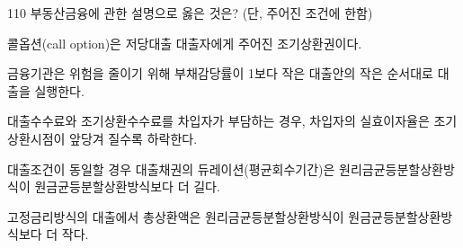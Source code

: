 \begin{question}{110}
부동산금융에 관한 설명으로 옳은 것은? (단, 주어진 조건에 한함)
\begin{choices}
  \item 콜옵션(call option)은 저당대출 대출자에게 주어진 조기상환권이다.
  \item 금융기관은 위험을 줄이기 위해 부채감당률이 1보다 작은 대출안의 작은 순서대로 대출을 실행한다.
  \item 대출수수료와 조기상환수수료를 차입자가 부담하는 경우, 차입자의 실효이자율은 조기상환시점이 앞당겨 질수록 하락한다.
  \item 대출조건이 동일할 경우 대출채권의 듀레이션(평균회수기간)은 원리금균등분할상환방식이 원금균등분할상환방식보다 더 길다.
  \item 고정금리방식의 대출에서 총상환액은 원리금균등분할상환방식이 원금균등분할상환방식보다 더 작다.
\end{choices}
\end{question}
